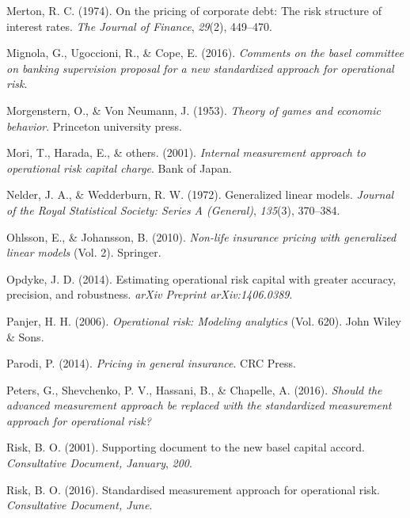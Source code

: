 \documentclass{DissertateUSU}
\begin{document}
\leavevmode\hypertarget{ref-merton1974pricing}{}%
Merton, R. C. (1974). On the pricing of corporate debt: The risk
structure of interest rates. \emph{The Journal of Finance},
\emph{29}(2), 449--470.

\leavevmode\hypertarget{ref-mignola2016comments}{}%
Mignola, G., Ugoccioni, R., \& Cope, E. (2016). \emph{Comments on the
basel committee on banking supervision proposal for a new standardized
approach for operational risk}.

\leavevmode\hypertarget{ref-morgenstern1953theory}{}%
Morgenstern, O., \& Von Neumann, J. (1953). \emph{Theory of games and
economic behavior}. Princeton university press.

\leavevmode\hypertarget{ref-mori2001internal}{}%
Mori, T., Harada, E., \& others. (2001). \emph{Internal measurement
approach to operational risk capital charge}. Bank of Japan.

\leavevmode\hypertarget{ref-nelder1972generalized}{}%
Nelder, J. A., \& Wedderburn, R. W. (1972). Generalized linear models.
\emph{Journal of the Royal Statistical Society: Series A (General)},
\emph{135}(3), 370--384.

\leavevmode\hypertarget{ref-ohlsson2010non}{}%
Ohlsson, E., \& Johansson, B. (2010). \emph{Non-life insurance pricing
with generalized linear models} (Vol. 2). Springer.

\leavevmode\hypertarget{ref-opdyke2014estimating}{}%
Opdyke, J. D. (2014). Estimating operational risk capital with greater
accuracy, precision, and robustness. \emph{arXiv Preprint
arXiv:1406.0389}.

\leavevmode\hypertarget{ref-panjer2006operational}{}%
Panjer, H. H. (2006). \emph{Operational risk: Modeling analytics} (Vol.
620). John Wiley \& Sons.

\leavevmode\hypertarget{ref-parodi2014pricing}{}%
Parodi, P. (2014). \emph{Pricing in general insurance}. CRC Press.

\leavevmode\hypertarget{ref-peters2016should}{}%
Peters, G., Shevchenko, P. V., Hassani, B., \& Chapelle, A. (2016).
\emph{Should the advanced measurement approach be replaced with the
standardized measurement approach for operational risk?}

\leavevmode\hypertarget{ref-risk2001supporting}{}%
Risk, B. O. (2001). Supporting document to the new basel capital accord.
\emph{Consultative Document, January}, \emph{200}.

\leavevmode\hypertarget{ref-risk2016supporting}{}%
Risk, B. O. (2016). Standardised measurement approach for operational
risk. \emph{Consultative Document, June}.
\end{document}
